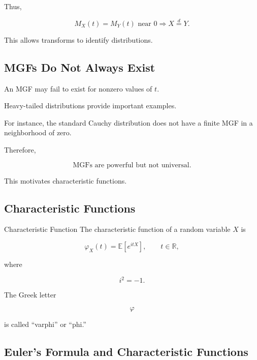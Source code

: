 Thus,

\[
\boxed{
M_X(t)=M_Y(t)
\text{ near }0
\Longrightarrow
X\overset{d}{=}Y.
}
\]

This allows transforms to identify distributions.

\subsection{MGFs Do Not Always Exist}
\label{subsec:mgf-not-always-exist}

An MGF may fail to exist for nonzero values of \(t\).

Heavy-tailed distributions provide important examples.

For instance, the standard Cauchy distribution does not have a finite
MGF in a neighborhood of zero.

Therefore,

\[
\boxed{
\text{MGFs are powerful but not universal}.
}
\]

This motivates characteristic functions.

\subsection{Characteristic Functions}
\label{subsec:characteristic-functions}

\begin{definitionbox}{Characteristic Function}
The characteristic function of a random variable \(X\) is

\[
\boxed{
\varphi_X(t)
=
\mathbb{E}[e^{itX}],
\qquad
t\in\mathbb{R},
}
\]

where

\[
i^2=-1.
\]
\end{definitionbox}

The Greek letter

\[
\varphi
\]

is called ``varphi'' or ``phi.''

\subsection{Euler's Formula and Characteristic Functions}
\label{subsec:euler-characteristic}

